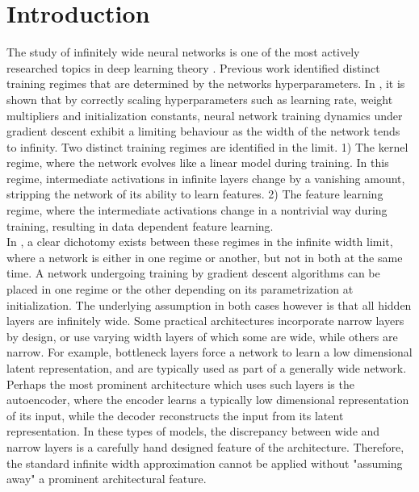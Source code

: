 \documentclass{article}
\theoremstyle{definition}
\theoremstyle{remark}
\renewcommand{\[}{\begin{eqnarray}}
\renewcommand{\]}{\end{eqnarray}}
\renewcommand{\[}{\begin{eqnarray}}
\renewcommand{\]}{\end{eqnarray}}
\begin{document}
\section{Introduction}
The study of infinitely wide neural networks is one of the most actively researched topics in deep learning theory \cite{NTK,gp1,gp2,gp3,gp4,gp5,gp6,gp7,yang,yang2,yang3,TP2b,Littwin2020OnRK,Littwin2020OnTO}. Previous work identified distinct training regimes that are determined by the networks hyperparameters. In \cite{Yang2020FeatureLI}, it is shown that by correctly scaling hyperparameters such as learning rate, weight multipliers and initialization constants, neural network training dynamics under gradient descent exhibit a limiting behaviour as the width of the network tends to infinity. Two distinct training regimes are identified in the limit. 1) The kernel regime, where the network evolves like a linear model during training. In this regime, intermediate activations in infinite layers change by a vanishing amount, stripping the network of its ability to learn features. 
2) The feature learning regime, where the intermediate activations change in a nontrivial way during training, resulting in data dependent feature learning. \\
In \cite{Yang2020FeatureLI}, a clear dichotomy exists between these regimes in the infinite width limit, where a network is either in one regime or another, but not in both at the same time. A network undergoing training by gradient descent algorithms can be placed in one regime or the other depending on its parametrization at initialization. The underlying assumption in both cases however is that all hidden layers are infinitely wide. 
Some practical architectures incorporate narrow layers by design, or use varying width layers of which some are wide, while others are narrow. For example, bottleneck layers force a network to learn a low dimensional latent representation, and are typically used as part of a generally wide network. Perhaps the most prominent architecture which uses such layers is the autoencoder, where the encoder learns a typically low dimensional representation of its input, while the decoder reconstructs the input from its latent representation.
In these types of models, the discrepancy between wide and narrow layers is a carefully hand designed feature of the architecture. Therefore, the standard infinite width approximation cannot be applied without "assuming away" a prominent architectural feature.\\
\end{document}
